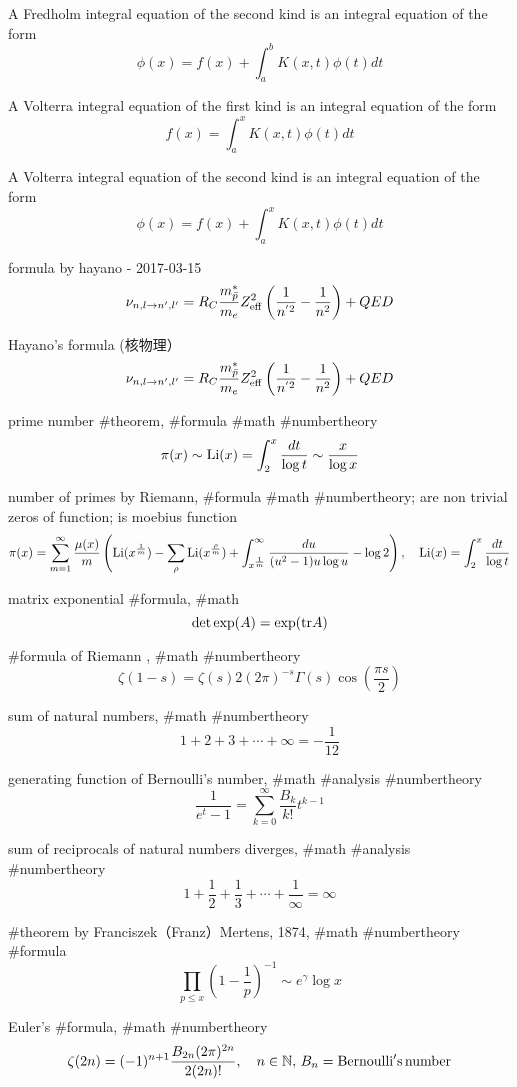 A Fredholm integral equation of the second kind is an integral equation of the form
$$
\phi(x)=f(x)+\int^b_a K(x,t)\phi(t)dt
$$

A Volterra integral equation of the first kind is an integral equation of the form
$$
f(x)=\int^x_a K(x,t)\phi(t)dt
$$

A Volterra integral equation of the second kind is an integral equation of the form
$$
\phi(x)=f(x)+\int^x_a K(x,t)\phi(t)dt
$$

formula by hayano - 2017-03-15
$$
\displaystyle\nu_{\small{n,l\rightarrow n',l'}}=R_C\frac{m^*_{{\bar p}}}{m_e}Z^2_{\rm eff}\left(\frac{1}{n^{'2}}-\frac{1}{n^2}\right)+{QED}
$$

Hayano’s formula (核物理）
$$
\displaystyle\nu_{\small{n,l\rightarrow n',l'}}=R_C\frac{m^*_{{\bar p}}}{m_e}Z^2_{\rm eff}\left(\frac{1}{n^{'2}}-\frac{1}{n^2}\right)+{QED}
$$

prime number #theorem, #formula #math #numbertheory
$$
\pi(x) \sim {\rm Li}(x)=\int^x_2\frac{dt}{\log t} \sim \frac{x}{\log x}
$$

number of primes by Riemann, #formula #math #numbertheory; \rho are non trivial zeros of \zeta function; \mu is moebius function
$$
\pi(x)=\sum^\infty_{m=1}\frac{\mu(x)}{m}\left({\rm Li}(x^{\frac{1}{m}})-\sum_\rho{\rm Li}(x^{\frac{\rho}{m}})+\int^\infty_{x^\frac{1}{m}}\frac{du}{(u^2-1)u\log u}-\log 2\right), \quad {\rm Li}(x)=\int^x_2\frac{dt}{\log t}
$$

matrix exponential #formula, #math
$$
{\rm det}\exp(A)=\exp({\rm tr}A)
$$

#formula of Riemann \zeta, #math #numbertheory
$$
\zeta(1-s)=\zeta(s)2(2\pi)^{-s}\Gamma(s)\cos\left(\frac{\pi s}{2}\right)
$$

sum of natural numbers, #math #numbertheory
$$
1+2+3+\cdots+\infty=-\frac{1}{12}
$$

generating function of Bernoulli's number, #math #analysis #numbertheory
$$
\frac{1}{e^t-1}=\sum^\infty_{k=0}\frac{B_k}{k!}t^{k-1}
$$

sum of reciprocals of natural numbers diverges, #math #analysis #numbertheory
$$
1+\frac{1}{2}+\frac{1}{3}+\cdots+\frac{1}{\infty}=\infty
$$

#theorem by Franciszek（Franz）Mertens, 1874, #math #numbertheory #formula
$$
\prod_{p \le x}\left(1-\frac{1}{p}\right)^{-1} \sim e^\gamma \log x
$$

Euler’s #formula, #math #numbertheory
$$
\zeta(2n)=(-1)^{n+1}\frac{B_{2n} (2\pi)^{2n}}{2(2n)!}, \quad n\in\mathbb{N},\,B_n={\rm Bernoulli's}\,{\rm number}
$$

